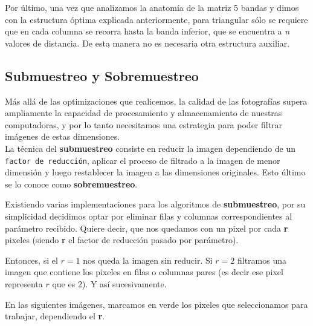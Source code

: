 \documentclass[a4paper]{article}
\begin{document}
Por último, una vez que analizamos la anatomía de la matriz 5 bandas y dimos con la estructura óptima explicada anteriormente, para triangular sólo se requiere que en cada columna se recorra hasta la banda inferior, que se encuentra a \textit{n} valores de distancia. De esta manera no es necesaria otra estructura auxiliar.  

\newpage

\subsection{Submuestreo y Sobremuestreo}

Más allá de las optimizaciones que realicemos, la calidad de las fotografías supera ampliamente la capacidad de procesamiento y almacenamiento de nuestras computadoras, y por lo tanto necesitamos una estrategia para poder filtrar imágenes de estas dimensiones. \\

La técnica del \textbf{submuestreo} consiste en reducir la imagen dependiendo de un \texttt{factor de reducción}, aplicar el proceso de filtrado a la imagen de menor dimensión y luego restablecer la imagen a las dimensiones originales. Esto último se lo conoce como \textbf{sobremuestreo}.

Existiendo varias implementaciones para los algoritmos de \textbf{submuestreo}, por su simplicidad decidimos optar por eliminar filas y columnas correspondientes al parámetro recibido. Quiere decir, que nos quedamos con un pixel por cada \textbf{r} pixeles (siendo \textbf{r} el factor de reducción pasado por parámetro).

Entonces, si el $r=1$ nos queda la imagen sin reducir. Si $r=2$ filtramos una imagen que contiene los pixeles en filas o columnas pares (es decir ese pixel representa $r$ que es 2). Y así sucesivamente.

En las siguientes imágenes, marcamos en verde los pixeles que seleccionamos para trabajar, dependiendo el \textbf{r}.
\end{document}
